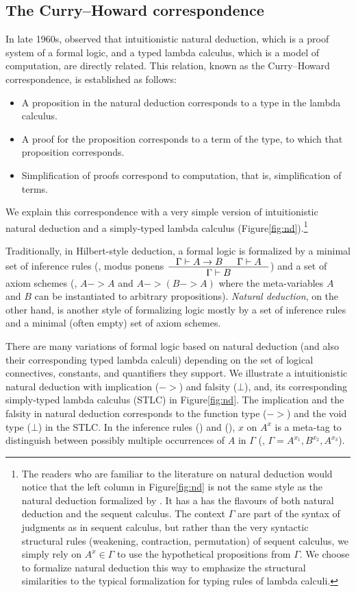 \subsection{The Curry--Howard correspondence}
In late 1960s, \citet{Howard69} observed that intuitionistic natural deduction,
which is a proof system of a formal logic, and a typed lambda calculus,
which is a model of computation, are directly related. This relation,
known as the Curry--Howard correspondence, is established as follows:
\begin{itemize}
\item A proposition in the natural deduction corresponds to
	a type in the lambda calculus.
\item A proof for the proposition corresponds to
	a term of the type, to which that proposition corresponds.
\item Simplification of proofs correspond to computation,
	that is, simplification of terms.
\end{itemize}
We explain this correspondence with a very simple
version of intuitionistic natural deduction and
a simply-typed lambda calculus (Figure\;\ref{fig:nd}).\footnote{
	The readers who are familiar to the literature on natural deduction
	would notice that the left column in Figure\;\ref{fig:nd} is not
	the same style as the natural deduction formalized by
	\citet{Gentzen35,Gentzen69}. It has a has the flavours of
	both natural deduction and the sequent calculus. The context $\Gamma$
	are part of the syntax of judgments as in sequent calculus,
	but rather than the very syntactic structural rules (weakening,
	contraction, permutation) of sequent calculus, we simply rely on
	$A^x \in \Gamma$ to use the hypothetical propositions from $\Gamma$.
	We choose to formalize natural deduction this way to emphasize
	the structural similarities to the typical formalization
	for typing rules of lambda calculi.}

Traditionally, in Hilbert-style deduction, a formal logic is formalized
by a minimal set of inference rules (\eg, modus ponens
$\inference{\Gamma |- A -> B & \Gamma |- A}{\Gamma |- B}$)
and a set of axiom schemes (\eg, $A -> A$ and $A -> (B -> A)$ where
the meta-variables $A$ and $B$ can be instantiated to arbitrary propositions).
\emph{Natural deduction}, on the other hand, is another style of
formalizing logic mostly by a set of inference rules and a minimal
(often empty) set of axiom schemes.

There are many variations of formal logic based on natural deduction
(and also their corresponding typed lambda calculi) depending on
the set of logical connectives, constants, and quantifiers they support.
We illustrate a intuitionistic natural deduction with implication ($->$) and
falsity ($\bot$), and, its corresponding simply-typed lambda calculus (STLC)
in Figure\;\ref{fig:nd}. The implication and the falsity in natural deduction
corresponds to the function type ($->$) and the void type ($\bot$) in the STLC.
In the inference rules () and (),
$x$ on $A^x$ is a meta-tag to distinguish between possibly multiple
occurrences of $A$ in $\Gamma$ (\eg, $\Gamma = A^{x_1},B^{x_2},A^{x_3}$).

